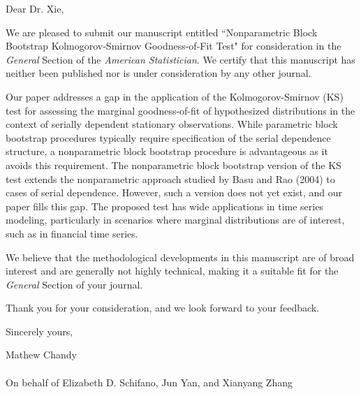 \documentclass[12pt]{article}
\begin{document}

\bigskip

Dear Dr. Xie,

We are pleased to submit our manuscript entitled 
``Nonparametric Block Bootstrap Kolmogorov-Smirnov Goodness-of-Fit
Test"  for consideration in the \emph{General} Section of the
\textit{American Statistician}. We certify that this manuscript has
neither been published nor is under consideration by any other
journal.


Our paper addresses a gap in the application of the Kolmogorov-Smirnov
(KS) test for assessing the marginal goodness-of-fit of hypothesized
distributions in the context of serially dependent stationary
observations. While parametric block bootstrap procedures typically
require specification of the serial dependence structure, a
nonparametric block bootstrap procedure is advantageous as it avoids
this requirement. The nonparametric block bootstrap version of the KS
test extends the nonparametric approach studied by Basu and Rao
(2004) to cases of serial dependence. However, such a version does not
yet exist, and our paper fills this gap. The proposed test has wide
applications in time series modeling, particularly in scenarios where
marginal distributions are of interest, such as in financial time series.


We believe that the methodological developments in this manuscript are
of broad interest and are generally not highly technical, making it a
suitable fit for the \emph{General} Section of your journal.


Thank you for your consideration, and we look forward to your feedback.


\bigskip

Sincerely yours,

\vspace{2cm}

Mathew Chandy\\ \\On behalf of Elizabeth D. Schifano, Jun Yan, and 
Xianyang Zhang
\end{document}
